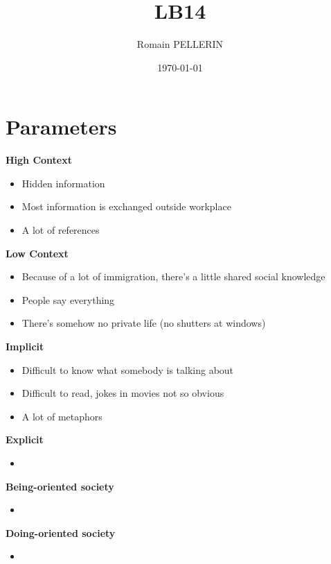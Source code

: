 \documentclass[11pt,a4paper,oneside,french,svgnames]{report}
\title{LB14}
\author{Romain PELLERIN}
\date\today
\begin{document}
\scriptsize

\section*{Parameters}

\begin{center}
\begin{minipage}[t]{.45\textwidth}
\centering\textbf{High Context}\\
  \begin{itemize}
    \item Hidden information
    \item Most information is exchanged outside workplace
    \item A lot of references
  \end{itemize}
\end{minipage}
\begin{minipage}[t]{.45\textwidth}
\centering\textbf{Low Context}\\
  \begin{itemize}
    \item Because of a lot of immigration, there's a little shared social knowledge
    \item People say everything
    \item There's somehow no private life (no shutters at windows)
  \end{itemize}
\end{minipage}

\begin{minipage}[t]{.45\textwidth}
\centering\textbf{Implicit}\\
  \begin{itemize}
    \item Difficult to know what somebody is talking about
    \item Difficult to read, jokes in movies not so obvious
    \item A lot of metaphors
  \end{itemize}
\end{minipage}
\begin{minipage}[t]{.45\textwidth}
\centering\textbf{Explicit}\\
  \begin{itemize}
    \item
  \end{itemize}
\end{minipage}

\begin{minipage}[t]{.45\textwidth}
\centering\textbf{Being-oriented society}\\
  \begin{itemize}
    \item
  \end{itemize}
\end{minipage}
\begin{minipage}[t]{.45\textwidth}
\centering\textbf{Doing-oriented society}\\
  \begin{itemize}
    \item
  \end{itemize}
\end{minipage}


\end{center}
\end{document}
